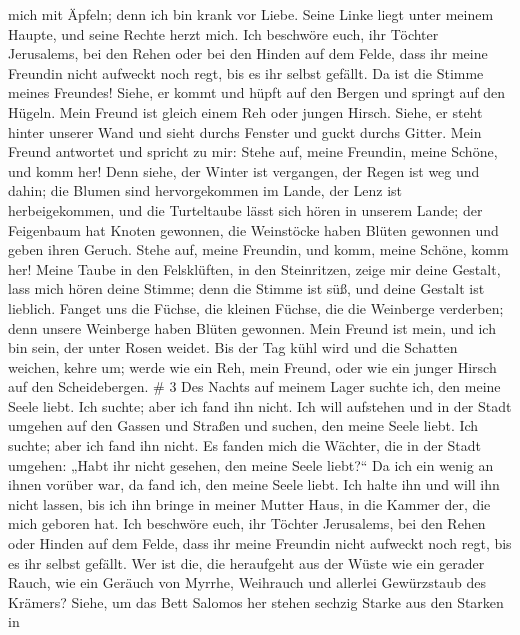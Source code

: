 mich mit Äpfeln; denn ich bin krank vor Liebe.  Seine Linke
liegt unter meinem Haupte, und seine Rechte herzt mich.  Ich
beschwöre euch, ihr Töchter Jerusalems, bei den Rehen oder bei den
Hinden auf dem Felde, dass ihr meine Freundin nicht aufweckt noch regt,
bis es ihr selbst gefällt.  Da ist die Stimme meines
Freundes! Siehe, er kommt und hüpft auf den Bergen und springt auf den
Hügeln.  Mein Freund ist gleich einem Reh oder jungen
Hirsch. Siehe, er steht hinter unserer Wand und sieht durchs Fenster und
guckt durchs Gitter.  Mein Freund antwortet und spricht zu
mir: Stehe auf, meine Freundin, meine Schöne, und komm her!
 Denn siehe, der Winter ist vergangen, der Regen ist weg
und dahin;  die Blumen sind hervorgekommen im Lande, der
Lenz ist herbeigekommen, und die Turteltaube lässt sich hören in unserem
Lande;  der Feigenbaum hat Knoten gewonnen, die Weinstöcke
haben Blüten gewonnen und geben ihren Geruch. Stehe auf, meine Freundin,
und komm, meine Schöne, komm her!  Meine Taube in den
Felsklüften, in den Steinritzen, zeige mir deine Gestalt, lass mich
hören deine Stimme; denn die Stimme ist süß, und deine Gestalt ist
lieblich.  Fanget uns die Füchse, die kleinen Füchse, die
die Weinberge verderben; denn unsere Weinberge haben Blüten gewonnen.
 Mein Freund ist mein, und ich bin sein, der unter Rosen
weidet.  Bis der Tag kühl wird und die Schatten weichen,
kehre um; werde wie ein Reh, mein Freund, oder wie ein junger Hirsch auf
den Scheidebergen. \# 3  Des Nachts auf meinem Lager suchte
ich, den meine Seele liebt. Ich suchte; aber ich fand ihn nicht.
 Ich will aufstehen und in der Stadt umgehen auf den Gassen
und Straßen und suchen, den meine Seele liebt. Ich suchte; aber ich fand
ihn nicht.  Es fanden mich die Wächter, die in der Stadt
umgehen: „Habt ihr nicht gesehen, den meine Seele liebt?{}``
 Da ich ein wenig an ihnen vorüber war, da fand ich, den
meine Seele liebt. Ich halte ihn und will ihn nicht lassen, bis ich ihn
bringe in meiner Mutter Haus, in die Kammer der, die mich geboren hat.
 Ich beschwöre euch, ihr Töchter Jerusalems, bei den Rehen
oder Hinden auf dem Felde, dass ihr meine Freundin nicht aufweckt noch
regt, bis es ihr selbst gefällt.  Wer ist die, die
heraufgeht aus der Wüste wie ein gerader Rauch, wie ein Geräuch von
Myrrhe, Weihrauch und allerlei Gewürzstaub des Krämers? 
Siehe, um das Bett Salomos her stehen sechzig Starke aus den Starken in
